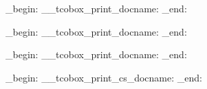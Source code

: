 \NewDocumentCommand {}
  {
    \group_begin:
    \textcolor{\kvtcb@col@value}{\__tcobox_print_docname:}
      {
        \kvtcb@index@command{\kvtcb@doc@sortindex\idx@actual\tcbIndexPrintValCA{\kvtcb@doc@index}}
        \kvtcb@index@command{\kvtcb@text@values\idx@level\kvtcb@doc@sortindex\idx@actual\tcbIndexPrintValC{\kvtcb@doc@index}}
      }
    \group_end:
  }


\NewDocumentCommand {}
  {
    \group_begin:
    \textcolor{\kvtcb@col@color}{\__tcobox_print_docname:}
      {
        \kvtcb@index@command{\kvtcb@doc@sortindex\idx@actual\tcbIndexPrintColCA{\kvtcb@doc@index}}
        \kvtcb@index@command{\kvtcb@text@colors\idx@level\kvtcb@doc@sortindex\idx@actual\tcbIndexPrintColC{\kvtcb@doc@index}}
      }
    \group_end:
  }


\NewDocumentCommand {}
  {
    \group_begin:
    \textcolor{\kvtcb@col@counter}{\__tcobox_print_docname:}
      {
        \kvtcb@index@command{\kvtcb@doc@sortindex\idx@actual\tcbIndexPrintCountCA{\kvtcb@doc@index}}
        \kvtcb@index@command{\kvtcb@text@counters\idx@level\kvtcb@doc@sortindex\idx@actual\tcbIndexPrintCountC{\kvtcb@doc@index}}
      }
    \group_end:
  }


\NewDocumentCommand {}
  {
    \group_begin:
    \textcolor{\kvtcb@col@length}{\__tcobox_print_cs_docname:}
      {
        \kvtcb@index@command{\kvtcb@doc@sortindex\idx@actual\tcbIndexPrintLenCA{\kvtcb@doc@index}}
        \kvtcb@index@command{\kvtcb@text@lengths\idx@level\kvtcb@doc@sortindex\idx@actual\tcbIndexPrintLenC{\kvtcb@doc@index}}
      }
    \group_end:
  }


\ExplSyntaxOff


\NewDocumentCommand{}

\def\refCom{\tcb@ref@doc{com}}
\def\refEnv{\tcb@ref@doc{env}}
\def\refKey{\tcb@ref@doc{key}}
\def\refPathOperation{\tcb@ref@doc{path}}


